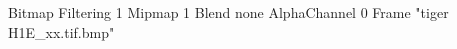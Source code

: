 {Bitmap
	{Filtering 1}
	{Mipmap 1}
	{Blend none}
	{AlphaChannel 0}
	{Frame "tiger H1E_xx.tif.bmp"}
}
